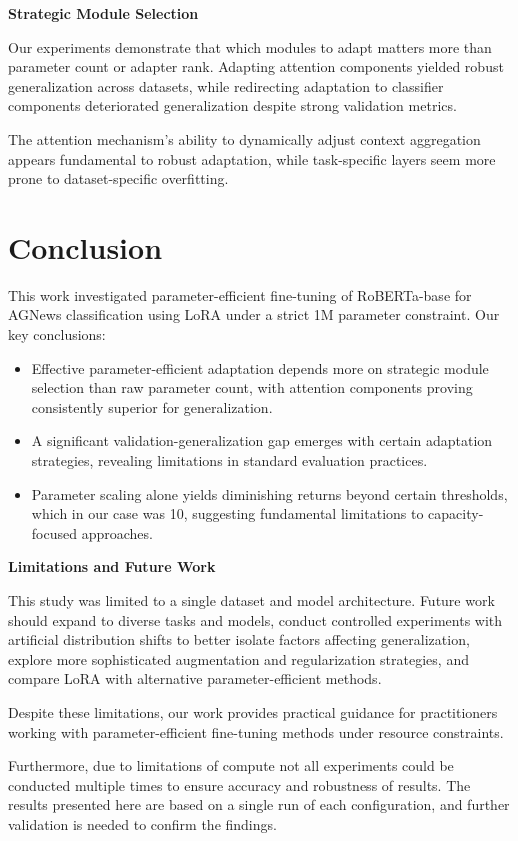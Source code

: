 \documentclass[letterpaper]{article}
\begin{document}
\textbf{Strategic Module Selection}

Our experiments demonstrate that which modules to adapt matters more than parameter count or adapter rank. Adapting attention components yielded robust generalization across datasets, while redirecting adaptation to classifier components deteriorated generalization despite strong validation metrics.

The attention mechanism's ability to dynamically adjust context aggregation appears fundamental to robust adaptation, while task-specific layers seem more prone to dataset-specific overfitting.

\section{Conclusion}

This work investigated parameter-efficient fine-tuning of RoBERTa-base for AGNews classification using LoRA under a strict 1M parameter constraint. Our key conclusions:

\begin{itemize}
    \item Effective parameter-efficient adaptation depends more on strategic module selection than raw parameter count, with attention components proving consistently superior for generalization.
    
    \item A significant validation-generalization gap emerges with certain adaptation strategies, revealing limitations in standard evaluation practices.
    
    \item Parameter scaling alone yields diminishing returns beyond certain thresholds, which in our case was 10, suggesting fundamental limitations to capacity-focused approaches.
\end{itemize}

\textbf{Limitations and Future Work}

This study was limited to a single dataset and model architecture. Future work should expand to diverse tasks and models, conduct controlled experiments with artificial distribution shifts to better isolate factors affecting generalization, explore more sophisticated augmentation and regularization strategies, and compare LoRA with alternative parameter-efficient methods.

Despite these limitations, our work provides practical guidance for practitioners working with parameter-efficient fine-tuning methods under resource constraints. 

Furthermore, due to limitations of compute not all experiments could be conducted multiple times to ensure accuracy and robustness of results. The results presented here are based on a single run of each configuration, and further validation is needed to confirm the findings.



\end{document}
